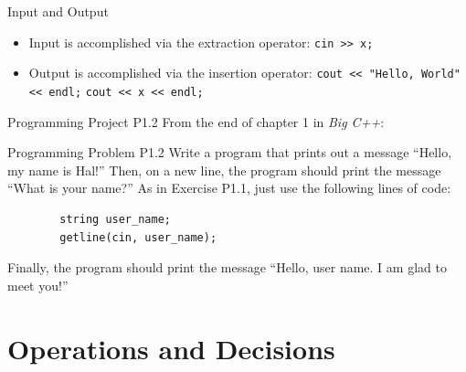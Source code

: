 \documentclass[handout]{beamer}
\begin{document}
\begin{frame}[fragile]{Input and Output}
    \begin{itemize}
        \item Input is accomplished via the extraction operator:
            \newline\texttt{cin >> x;}
        \item Output is accomplished via the insertion operator:
            \newline\texttt{cout << "Hello, World" << endl;}
            \newline\texttt{cout << x << endl;}
    \end{itemize}
\end{frame}

\begin{frame}[fragile]{Programming Project P1.2}
    From the end of chapter 1 in \textit{Big C++}:

    \begin{block}{Programming Problem P1.2}
    Write a program that prints out a message ``Hello, my name is
    Hal!''
    Then, on a new line, the program should print the message ``What is
    your name?'' As in Exercise P1.1, just use the following lines of
    code:

    \begin{verbatim}
        string user_name;
        getline(cin, user_name);
    \end{verbatim}

    Finally, the program should print the message ``Hello, user name.
    I am glad to meet you!'' 
    \end{block}
\end{frame}

\section{Operations and Decisions}
\end{document}
